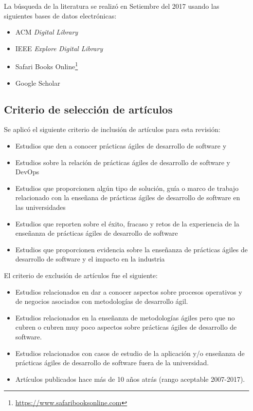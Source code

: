 La búsqueda de la literatura se realizó en Setiembre del 2017 usando las siguientes bases de datos electrónicas:
\begin{itemize}
    \item ACM \emph{Digital Library} 
    \item IEEE \emph{Explore Digital Library}
    \item Safari Books Online\footnote{\url{https://www.safaribooksonline.com}}
    \item Google Scholar
\end{itemize}

\subsection{Criterio de selección de artículos}
Se aplicó el siguiente criterio de inclusión de artículos para esta revisión:
\begin{itemize}
    \item Estudios que den a conocer prácticas ágiles de desarrollo de software y 
    \item Estudios sobre la relación de prácticas ágiles de desarrollo de software y DevOps 
    \item Estudios que proporcionen algún tipo de solución, guía o marco de trabajo relacionado con la enseñana de prácticas ágiles de desarrollo de software en las universidades
    \item Estudios que reporten sobre el éxito, fracaso y retos de la experiencia de la enseñanza de prácticas ágiles de desarrollo de software
    \item Estudios que proporcionen evidencia sobre la enseñanza de prácticas ágiles de desarrollo de software y el impacto en la industria
\end{itemize}

El criterio de exclusión de artículos fue el siguiente:
\begin{itemize}
    \item Estudios relacionados en dar a conocer aspectos sobre procesos operativos y de negocios asociados con metodologías de desarrollo ágil.
    \item Estudios relacionados en la enseñanza de metodologías ágiles pero que no cubren o cubren muy poco aspectos sobre prácticas ágiles de desarrollo de software.
    \item Estudios relacionados con casos de estudio de la aplicación y/o enseñanza de prácticas ágiles de desarrollo de software fuera de la universidad.
    \item Artículos publicados hace más de 10 años atrás (rango aceptable 2007-2017).
\end{itemize}


